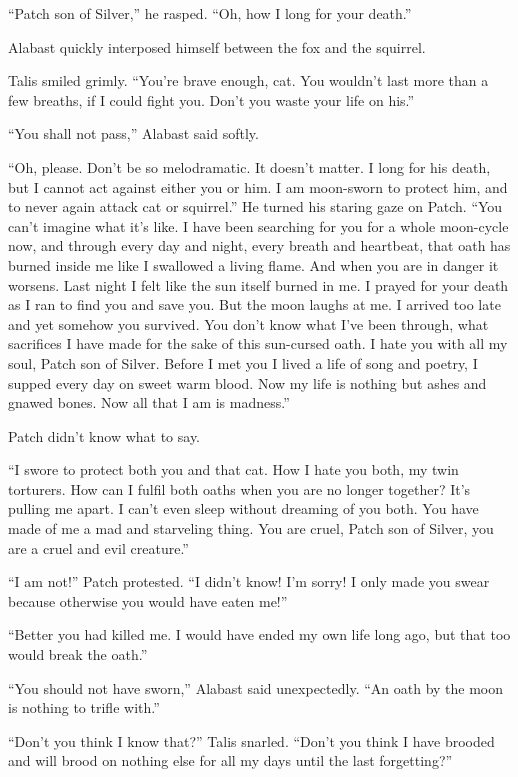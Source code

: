 \documentclass[ebook,oneside,openany,17pt]{memoir}
\newenvironment{tolerant}[1]{%
  \par\tolerance=#1\relax
}{%
  \par
}
\begin{document}
“Patch son of Silver,” he rasped. “Oh, how I long for your death.”

Alabast quickly interposed himself between the fox and the squirrel.

Talis smiled grimly. “You’re brave enough, cat. You wouldn’t last more
than a few breaths, if I could fight you. Don’t you waste your life on
his.”

“You shall not pass,” Alabast said softly.

“Oh, please. Don’t be so melodramatic. It doesn’t matter. I long for
his death, but I cannot act against either you or him. I am moon-sworn
to protect him, and to never again attack cat or squirrel.” He turned
his staring gaze on Patch. “You can’t imagine what it’s like. I have
been searching for you for a whole moon-cycle now, and through every
day and night, every breath and heartbeat, that oath has burned inside
me like I swallowed a living flame. And when you are in danger it
worsens. Last night I felt like the sun itself burned in me. I prayed
for your death as I ran to find you and save you. But the moon laughs
at me. I arrived too late and yet somehow you survived. You don’t know
what I’ve been through, what sacrifices I have made for the sake of
this sun-cursed oath. I hate you with all my soul, Patch son of
Silver. Before I met you I lived a life of song and poetry, I supped
every day on sweet warm blood. Now my life is nothing but ashes and
gnawed bones. Now all that I am is madness.”

Patch didn’t know what to say.

“I swore to protect both you and that cat. How I hate you both, my
twin torturers. How can I fulfil both oaths when you are no longer
together? It’s pulling me apart. I can’t even sleep without dreaming
of you both. You have made of me a mad and starveling thing. You are
cruel, Patch son of Silver, you are a cruel and evil creature.”

“I am not!” Patch protested. “I didn’t know! I’m sorry! I only made
you swear because otherwise you would have eaten me!”

“Better you had killed me. I would have ended my own life long ago,
but that too would break the oath.”

“You should not have sworn,” Alabast said unexpectedly. “An oath by
the moon is nothing to trifle with.”

\begin{tolerant}{1000}
“Don’t you think I know that?” Talis snarled. “Don’t you think I have
brooded and will brood on nothing else for all my days until the last
forgetting?”
\end{tolerant}
\end{document}
